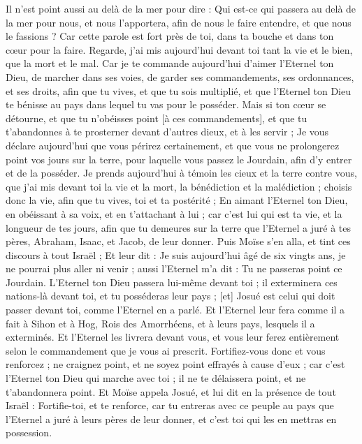 \begin{multicols}{2}
Il n'est point aussi au delà de la mer pour dire : Qui est-ce qui passera au delà de la mer pour nous, et nous l'apportera, afin de nous le faire entendre, et que nous le fassions ?
Car cette parole est fort près de toi, dans ta bouche et dans ton cœur pour la faire.
Regarde, j'ai mis aujourd'hui devant toi tant la vie et le bien, que la mort et le mal.
Car je te commande aujourd'hui d'aimer l'Eternel ton Dieu, de marcher dans ses voies, de garder ses commandements, ses ordonnances, et ses droits, afin que tu vives, et que tu sois multiplié, et que l'Eternel ton Dieu te bénisse au pays dans lequel tu vas pour le posséder.
Mais si ton cœur se détourne, et que tu n'obéisses point [à ces commandements], et que tu t'abandonnes à te prosterner devant d'autres dieux, et à les servir ;
Je vous déclare aujourd'hui que vous périrez certainement, et que vous ne prolongerez point vos jours sur la terre, pour laquelle vous passez le Jourdain, afin d'y entrer et de la posséder.
Je prends aujourd'hui à témoin les cieux et la terre contre vous, que j'ai mis devant toi la vie et la mort, la bénédiction et la malédiction ; choisis donc la vie, afin que tu vives, toi et ta postérité ;
En aimant l'Eternel ton Dieu, en obéissant à sa voix, et en t'attachant à lui ; car c'est lui qui est ta vie, et la longueur de tes jours, afin que tu demeures sur la terre que l'Eternel a juré à tes pères, Abraham, Isaac, et Jacob, de leur donner.
\VerseOne{}Puis Moïse s'en alla, et tint ces discours à tout Israël ;
Et leur dit : Je suis aujourd'hui âgé de six vingts ans, je ne pourrai plus aller ni venir ; aussi l'Eternel m'a dit : Tu ne passeras point ce Jourdain.
L'Eternel ton Dieu passera lui-même devant toi ; il exterminera ces nations-là devant toi, et tu posséderas leur pays ; [et] Josué est celui qui doit passer devant toi, comme l'Eternel en a parlé.
Et l'Eternel leur fera comme il a fait à Sihon et à Hog, Rois des Amorrhéens, et à leurs pays, lesquels il a exterminés.
Et l'Eternel les livrera devant vous, et vous leur ferez entièrement selon le commandement que je vous ai prescrit.
Fortifiez-vous donc et vous renforcez ; ne craignez point, et ne soyez point effrayés à cause d'eux ; car c'est l'Eternel ton Dieu qui marche avec toi ; il ne te délaissera point, et ne t'abandonnera point.
Et Moïse appela Josué, et lui dit en la présence de tout Israël : Fortifie-toi, et te renforce, car tu entreras avec ce peuple au pays que l'Eternel a juré à leurs pères de leur donner, et c'est toi qui les en mettras en possession.

\end{multicols}
